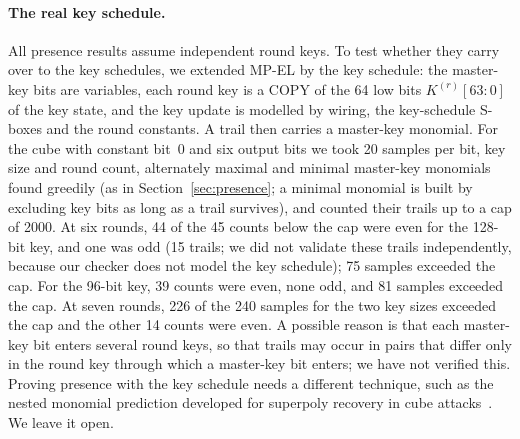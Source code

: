 \documentclass[pdflatex,sn-mathphys-num]{sn-jnl}
\theoremstyle{thmstyleone}
\theoremstyle{thmstylethree}
\theoremstyle{thmstyletwo}
\newcommand{\MPEL}{\textsf{MP-EL}}
\begin{document}
\paragraph{The real key schedule.} All presence results assume independent round keys. To test whether they carry over to the key schedules, we extended \MPEL{} by the key schedule: the master-key bits are variables, each round key is a COPY of the 64 low bits $K^{(r)}[63{:}0]$ of the key state, and the key update is modelled by wiring, the key-schedule S-boxes and the round constants. A trail then carries a master-key monomial. For the cube with constant bit~0 and six output bits we took 20 samples per bit, key size and round count, alternately maximal and minimal master-key monomials found greedily (as in Section~\ref{sec:presence}; a minimal monomial is built by excluding key bits as long as a trail survives), and counted their trails up to a cap of 2000. At six rounds, 44 of the 45 counts below the cap were even for the 128-bit key, and one was odd (15 trails; we did not validate these trails independently, because our checker does not model the key schedule); 75 samples exceeded the cap. For the 96-bit key, 39 counts were even, none odd, and 81 samples exceeded the cap. At seven rounds, 226 of the 240 samples for the two key sizes exceeded the cap and the other 14 counts were even. A possible reason is that each master-key bit enters several round keys, so that trails may occur in pairs that differ only in the round key through which a master-key bit enters; we have not verified this. Proving presence with the key schedule needs a different technique, such as the nested monomial prediction developed for superpoly recovery in cube attacks~\cite{hu2021nested}. We leave it open.
\end{document}
